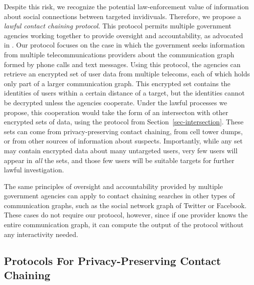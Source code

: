 Despite this risk, we recognize the potential law-enforcement value of information about social connections between targeted invidivuals. Therefore, we propose a \emph{lawful contact chaining protocol}. This protocol permits multiple government agencies working together to provide oversight and accountability, as advocated in \cite{sff-foci2014}. Our protocol focuses on the case in which the government seeks information from multiple telecommunications providers about the communication graph formed by phone calls and text messages. Using this protocol, the agencies can retrieve an encrypted set of user data from multiple telecoms, each of which holds only part of a larger communication graph. This encrypted set contains the identities of users within a certain distance of a target, but the identities cannot be decrypted unless the agencies cooperate. Under the lawful processes we propose, this cooperation would take the form of an intersecton with other encrypted sets of data, using the protocol from Section~\ref{sec-intersection}. These sets can come from privacy-preserving contact chaining, from cell tower dumps, or from other sources of information about suspects. Importantly, while any set may contain encrypted data about many untargeted users, very few users will appear in \emph{all} the sets, and those few users will be suitable targets for further lawful investigation.


The same principles of oversight and accountability provided by multiple government agencies can apply to contact chaining searches in other types of communication graphs, such as the social network graph of Twitter or Facebook. These cases do not require our protocol, however, since if one provider knows the entire communication graph, it can compute the output of the protocol without any interactivity needed.




\subsection{Protocols For Privacy-Preserving Contact Chaining}

\label{sec-proto}






